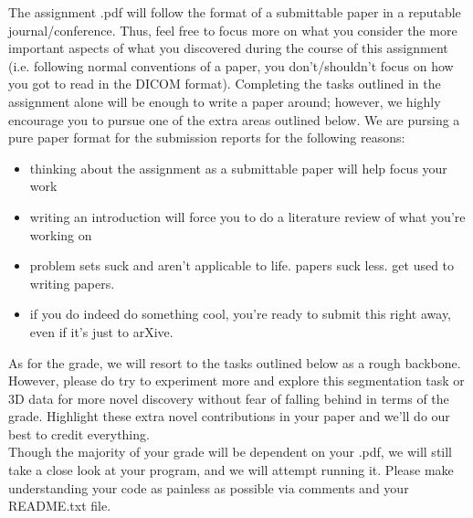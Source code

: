 \documentclass[10pt]{article}
\begin{document}
\indent The assignment .pdf will follow the format of a submittable paper in a reputable journal/conference.  Thus, feel free to focus more on what you consider the more important aspects of what you discovered during the course of this assignment (i.e. following normal conventions of a paper, you don't/shouldn't focus on how you got to read in the DICOM format).  Completing the tasks outlined in the assignment alone will be enough to write a paper around; however, we highly encourage you to pursue one of the extra areas outlined below.  We are pursing a pure paper format for the submission reports for the following reasons:
\begin{itemize}[noitemsep]
\item thinking about the assignment as a submittable paper will help focus your work
\item writing an introduction will force you to do a literature review of what you're working on
\item problem sets suck and aren't applicable to life.  papers suck less.  get used to writing papers.
\item if you do indeed do something cool, you're ready to submit this right away, even if it's just to arXive.
\end{itemize}
\indent As for the grade, we will resort to the tasks outlined below as a rough backbone.  However, please do try to experiment more and explore this segmentation task or 3D data for more novel discovery without fear of falling behind in terms of the grade.  Highlight these extra novel contributions in your paper and we'll do our best to credit everything.\\
\indent Though the majority of your grade will be dependent on your .pdf, we will still take a close look at your program, and we will attempt running it.  Please make understanding your code as painless as possible via comments and your README.txt file.
\end{document}

